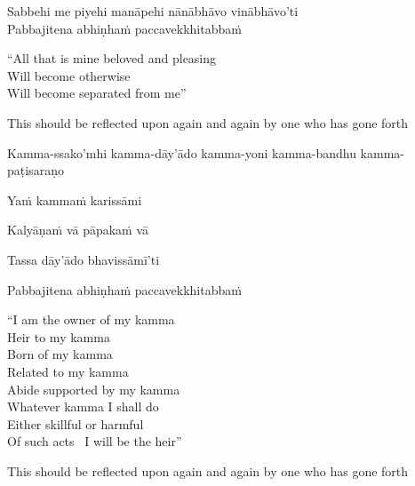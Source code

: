 Sabbehi me piyehi manāpehi nānābhāvo vinābhāvo'ti\\
Pabbajitena abhiṇhaṁ paccavekkhitabbaṁ

\begin{english-verses}
  ``All that is mine beloved and pleasing\\
  Will become otherwise\\
  Will become separated from me''
  \begin{english-hangtogether-verses}
    This should be reflected upon again and again by one who has gone forth
  \end{english-hangtogether-verses}
\end{english-verses}

\begin{pali-hang}
  Kamma-ssako'mhi kamma-dāy'ādo kamma-yoni kamma-bandhu kamma-paṭisaraṇo
\end{pali-hang}
\begin{pali-hangtogether}
  Yaṁ kammaṁ karissāmi
\end{pali-hangtogether}
\begin{pali-hangtogether}
  Kalyāṇaṁ vā pāpakaṁ vā
\end{pali-hangtogether}
\begin{pali-hangtogether}
  Tassa dāy'ādo bhavissāmī'ti
\end{pali-hangtogether}
\begin{pali-hangtogether}
  Pabbajitena abhiṇhaṁ paccavekkhitabbaṁ
\end{pali-hangtogether}

\begin{english-verses}
  ``I am the owner of my kamma\\
  Heir to my kamma\\
  Born of my kamma\\
  Related to my kamma\\
  Abide supported by my kamma\\
  Whatever kamma I shall do\\
  Either skillful or harmful\\
  Of such acts \breathmark\ I will be the heir''\makeatletter\hyperlink{endnote102-appendix}\makeatother
  \begin{english-hangtogether-verses}
    This should be reflected upon again and again by one who has gone forth
  \end{english-hangtogether-verses}
\end{english-verses}

